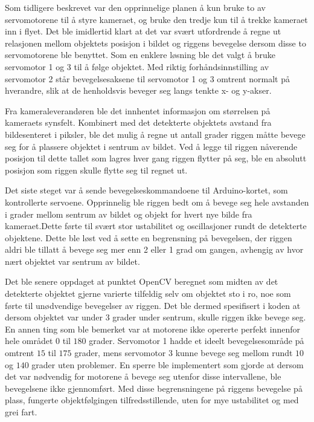 Som tidligere beskrevet var den opprinnelige planen å kun bruke to av servomotorene til å styre kameraet, og bruke den tredje kun til å trekke kameraet inn i flyet. Det ble imidlertid klart at det var svært utfordrende å regne ut relasjonen mellom objektets posisjon i bildet og riggens bevegelse dersom disse to servomotorene ble benyttet. Som en enklere løsning ble det valgt å bruke servomotor 1 og 3 til å følge objektet. Med riktig forhåndsinnstilling av servomotor 2 står bevegelsesaksene til servomotor 1 og 3 omtrent normalt på hverandre, slik at de henholdsvis beveger seg langs tenkte x- og y-akser.

Fra kameraleverandøren ble det innhentet informasjon om størrelsen på kameraets synsfelt. Kombinert med det detekterte objektets avstand fra bildesenteret i piksler, ble det mulig å regne ut antall grader riggen måtte bevege seg for å plassere objektet i sentrum av bildet. Ved å legge til riggen nåverende posisjon til dette tallet som lagres hver gang riggen flytter på seg, ble en absolutt posisjon som riggen skulle flytte seg til regnet ut.

Det siste steget var å sende bevegelseskommandoene til Arduino-kortet, som kontrollerte servoene. Opprinnelig ble riggen bedt om å bevege seg hele avstanden i grader mellom sentrum av bildet og objekt for hvert nye bilde fra kameraet.Dette førte til svært stor ustabilitet og oscillasjoner rundt de detekterte objektene. Dette ble løst ved å sette en begrensning på bevegelsen, der riggen aldri ble tillatt å bevege seg mer enn 2 eller 1 grad om gangen, avhengig av hvor nært objektet var sentrum av bildet.

Det ble senere oppdaget at punktet OpenCV beregnet som midten av det detekterte objektet gjerne varierte tilfeldig selv om objektet sto i ro, noe som førte til unødvendige bevegelser av riggen. Det ble dermed spesifisert i koden at dersom objektet var under 3 grader under sentrum, skulle riggen ikke bevege seg. En annen ting som ble bemerket var at motorene ikke opererte perfekt innenfor hele området $0$ til $180$ grader. Servomotor 1 hadde et ideelt bevegelsesområde på omtrent $15$ til $175$ grader, mens servomotor 3 kunne bevege seg mellom rundt $10$ og $140$ grader uten problemer. En sperre ble implementert som gjorde at dersom det var nødvendig for motorene å bevege seg utenfor disse intervallene, ble bevegelsene ikke gjennomført. Med disse begrensningene på riggens bevegelse på plass, fungerte objektfølgingen tilfredsstillende, uten for mye ustabilitet og med grei fart.
